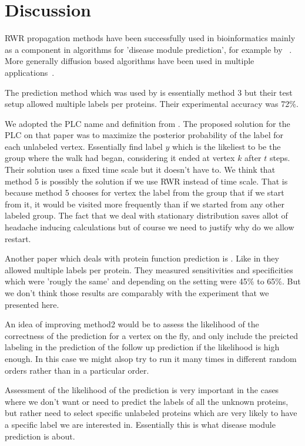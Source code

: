\section{Discussion}

RWR propagation methods have been successfully used in
bioinformatics mainly as a component in algorithms for 'disease
module prediction', for example by ~\cite{leiserson2015pan,
barel2020netcore}. More generally diffusion based algorithms have
been used in multiple applications~\cite{cowen2017network}.

The prediction method which was used by
\textcite{schwikowski2000network} is essentially method 3 but their
test setup allowed multiple labels per proteins. Their experimental accuracy
was 72\%.

We adopted the PLC name and definition from
\textcite{szummer2002partially}. The proposed solution for the PLC
on that paper was to maximize the posterior probability of the label
for each unlabeled vertex. Essentially find label $y$ which is the likeliest to
be the group where the walk had began, considering it ended at vertex $k$ after
$t$ steps. Their solution uses a fixed time scale but it doesn't have to. We
think that method 5 is possibly the solution if we use RWR instead of time scale.
That is because method 5 chooses for vertex the label from the group that if we
start from it, it would be visited more frequently than if we started from any
other labeled group. The fact that we deal with stationary distribution saves
allot of headache inducing calculations but of course we need to justify why do
we allow restart.

Another paper which deals with protein function prediction is
\textcite{deng2002prediction}. Like in \cite{schwikowski2000network}
they allowed multiple labels per protein. They measured
sensitivities and specificities which were 'rougly the same' and depending
on the setting were 45\% to 65\%. But we don't think those results
are comparably with the experiment that we presented here.

An idea of improving method2 would be to assess the likelihood of
the correctness of the prediction for a vertex on the fly, and only
include the preicted labeling in the prediction of the follow up
prediction if the likelihood is high enough. In this case we might
alsop try to run it many times in different random orders rather
than in a particular order.

Assessment of the likelihood of the prediction is very important in
the cases where we don't want or need to predict the labels of all
the unknown proteins, but rather need to select specific unlabeled
proteins which are very likely to have a specific label we are
interested in. Essentially this is what disease module prediction is about.

